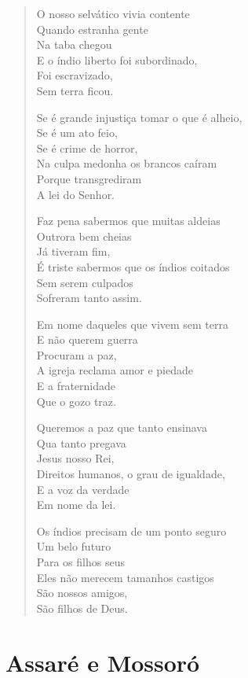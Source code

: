 \begin{verse}
O nosso selvático vivia contente\\
Quando estranha gente\\
Na taba chegou\\
E o índio liberto foi subordinado,\\
Foi escravizado,\\
Sem terra ficou.

Se é grande injustiça tomar o que é alheio,\\
Se é um ato feio,\\
Se é crime de horror,\\
Na culpa medonha os brancos caíram\\
Porque transgrediram\\
A lei do Senhor.

Faz pena sabermos que muitas aldeias\\
Outrora bem cheias\\
Já tiveram fim,\\
É triste sabermos que os índios coitados\\
Sem serem culpados\\
Sofreram tanto assim.

Em nome daqueles que vivem sem terra\\
E não querem guerra\\
Procuram a paz,\\
A igreja reclama amor e piedade\\
E a fraternidade\\
Que o gozo traz.

Queremos a paz que tanto ensinava\\
Qua tanto pregava\\
Jesus nosso Rei,\\
Direitos humanos, o grau de igualdade,\\
E a voz da verdade\\
Em nome da lei.

Os índios precisam de um ponto seguro\\
Um belo futuro\\
Para os filhos seus\\
Eles não merecem tamanhos castigos\\
São nossos amigos,\\
São filhos de Deus.
\end{verse}

\chapter{Assaré e Mossoró}


